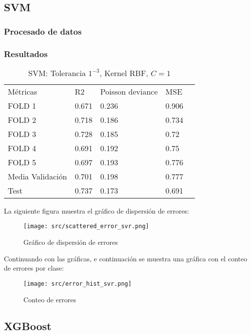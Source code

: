 \subsection{SVM}
\subsubsection{Procesado de datos}
\subsubsection{Resultados}
\begin{table}[H]
	  \centering
	\begin{tabular}{|l|l|l|l|l}
		\cline{1-4}
		Métricas         & R2      & Poisson deviance & MSE   \\ \cline{1-4}
		FOLD 1   		 & 0.671   & 0.236            & 0.906 \\ \cline {1-4}
		FOLD 2   		 & 0.718   & 0.186            & 0.734 \\ \cline {1-4}
		FOLD 3   		 & 0.728   & 0.185            & 0.72  \\ \cline {1-4}
		FOLD 4   		 & 0.691   & 0.192            & 0.75  \\ \cline {1-4}
		FOLD 5   		 & 0.697   & 0.193            & 0.776 \\ \cline {1-4}
		Media Validación & 0.701   & 0.198            & 0.777 \\ \cline {1-4}
		Test             & 0.737   & 0.173            & 0.691 \\ \cline {1-4}
	\end{tabular}
\caption{SVM: Tolerancia $1^{-3}$, Kernel RBF, $C=1$}
\label{tab:svm_res}
\end{table}
La siguiente figura muestra el gráfico de dispersión de errores:
\begin{figure}[H]
	\centering
	\texttt{[image: src/scattered\_error\_svr.png]}
	\caption{Gráfico de dispersión de errores}
	\label{fig:svr_scattered}
\end{figure}
Continuando con las gráficas, e continuación se muestra una gráfica con el conteo de errores por clase:\\
\linebreak
\begin{figure}[H]
	\centering
	\texttt{[image: src/error\_hist\_svr.png]}
	\caption{Conteo de errores}
	\label{fig:svr_error_plot}
\end{figure}
\subsection{XGBoost}
